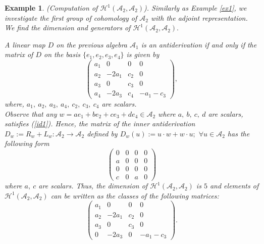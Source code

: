 \documentclass[12pt]{amsart}
\newtheorem{example}[Theorem]{Example}
\begin{document}
\begin{example} (Computation of $\mathcal{H}^1(\mathcal{A}_2,\mathcal{A}_2)$). 
	Similarly as Example \ref{ex1}, we investigate the first group of cohomology
	of $\mathcal{A}_2$ with the adjoint representation. We find the dimension and generators of $\mathcal{H}^1(\mathcal{A}_2,\mathcal{A}_2).$
	
	A linear map $D$ on the previous algebra $\mathcal{A}_1$ is an antiderivation if and only if the matrix of $D$ on the basis $\{e_1, e_2, e_3,e_4\}$ is given by
	$$\left(
	\begin{array}{cccc}
		a_1&0&0&0\\
		a_2&-2a_1&c_2&0\\
		a_3&0&c_3&0\\
		a_4&-2a_3&c_4&-a_1-c_3
	\end{array}
	\right),$$ where, $a_1,\ a_2,\ a_3,\ a_4,\ c_2,\ c_3,\ c_4$ are scalars.\\
	
	Observe that any $w=ae_1+be_2+ce_3+de_4 \in \mathcal{A}_2$ where $a,\ b,\ c,\ d$  are scalars, satisfies (\ref{id1}). Hence, the matrix of the inner antiderivation $D_w:= R_w+L_w:\mathcal{A}_2\rightarrow \mathcal{A}_2$ defined by $D_w (u):= u\cdot w+w\cdot u;$ $\forall u\in \mathcal{A}_2$ has the following form
	$$\left(
	\begin{array}{cccc}
		0&0&0&0\\
		a&0&0&0\\
		0&0&0&0\\
		c&0&a&0
	\end{array}
	\right)$$
	where $a,\ c$ are scalars. Thus, the dimension of $\mathcal{H}^1(\mathcal{A}_2,\mathcal{A}_2)$ is $5$ and elements of $\mathcal{H}^1(\mathcal{A}_2,\mathcal{A}_2)$
	can be written as the classes of the following matrices:
	$$\left(
	\begin{array}{cccc}
		a_1&0&0&0\\
		a_2&-2a_1&c_2&0\\
		a_3&0&c_3&0\\
		0&-2a_3&0&-a_1-c_3
	\end{array}
	\right).$$ 
\end{example}
\end{document}
